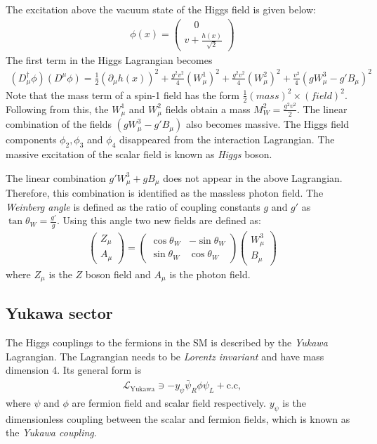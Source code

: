 The excitation above the vacuum state of the Higgs field is given below:
\begin{eqnarray}
\phi(x)=\left(\begin{array}{l}{\quad 0} \\ {v+\frac{h(x)}{\sqrt{2}}}\end{array}\right)
\end{eqnarray}
The first term in the Higgs Lagrangian becomes
\begin{eqnarray}
(D_{\mu}^{\dagger}\phi)(D^{\mu}\phi)=\frac{1}{2}(\partial_{\mu}h(x))^2+\frac{g^2v^2}{4}(W_{\mu}^1)^2+\frac{g^2v^2}{4}(W^2_{\mu})^2+\frac{v^2}{4}(g W_{\mu}^3-g'B_{\mu})^2
\end{eqnarray}
Note that the mass term of a spin-1 field has the form $\frac{1}{2}(mass)^2\times(field)^2$. Following from this, the $W_{\mu}^1$ and $W_{\mu}^2$ fields obtain a mass $M^2_W=\frac{g^2v^2}{2}$. The linear combination of the fields $(g W_{\mu}^3-g'B_{\mu})$ also becomes massive. The Higgs field components $\phi_2,\phi_3$ and $\phi_4$ disappeared from the interaction Lagrangian. The massive excitation of the scalar field is known as \textit{Higgs} boson.\par
The linear combination $g'W^3_{\mu}+gB_{\mu}$ does not appear in the above Lagrangian. Therefore, this combination is identified as the massless photon field. The \textit{Weinberg angle} is defined as the ratio of coupling constants $g$ and $g'$ as $\tan \theta_W=\frac{g'}{g}$. Using this angle two new fields are defined as:
\begin{eqnarray}
\left(\begin{array}{l}{Z_{\mu}} \\ {A_{\mu}}\end{array}\right)=\begin{pmatrix} 
\cos\theta_W & -\sin\theta_W \\
\sin\theta_W & \cos\theta_W 
\end{pmatrix}\left(\begin{array}{l}{W_{\mu}^3} \\ {B_{\mu}}\end{array}\right)
\end{eqnarray}  
where $Z_{\mu}$ is the $Z$ boson field and $A_{\mu}$ is the photon field.
\subsection{Yukawa sector}
The Higgs couplings to the fermions in the SM is described by the \textit{Yukawa} Lagrangian. The Lagrangian needs to be \textit{Lorentz invariant} and have mass dimension 4. Its general form is
\begin{eqnarray}
\mathcal{L}_{\mathrm{Yukawa}} \ni -y_{\psi}\bar{\psi}_R\phi\psi_L+ \mbox{c.c},
\end{eqnarray} 
where $\psi$ and $\phi$ are fermion field and scalar field respectively. $y_{\psi}$ is the dimensionless coupling between the scalar and fermion fields, which is known as the \textit{Yukawa coupling}.
